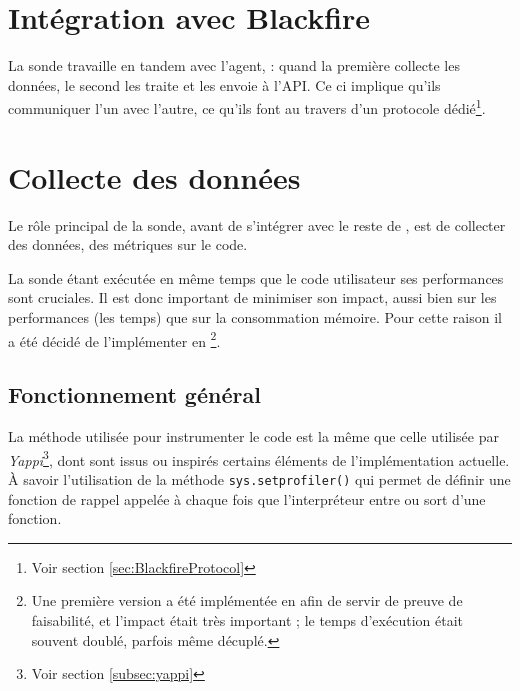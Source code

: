 
  \chapter[Intégration]{Intégration avec Blackfire}
  \label{chap:integration}
La sonde travaille en tandem avec l'agent, : quand la première collecte les données, le second les traite et les envoie à l'API. Ce ci implique qu'ils communiquer l'un avec l'autre, ce qu'ils font au travers d'un protocole dédié\footnote{Voir section \vref{sec:BlackfireProtocol}}.


  
  \chapter[Collecte]{Collecte des données}
Le rôle principal de la sonde, avant de s'intégrer avec le reste de \Blackfire, est de collecter des données, des métriques sur le code.

La sonde étant exécutée en même temps que le code utilisateur ses performances sont cruciales. Il est donc important de minimiser son impact, aussi bien sur les performances (les temps) que sur la consommation mémoire. Pour cette raison il a été décidé de l'implémenter en \C\footnote{Une première version a été implémentée en \Python afin de servir de preuve de faisabilité, et l'impact était très important ; le temps d'exécution était souvent doublé, parfois même décuplé.}.

  \section{Fonctionnement général}
La méthode utilisée pour instrumenter le code \Python est la même que celle utilisée par \emph{Yappi}\footnote{Voir section \vref{subsec:yappi}}, dont sont issus ou inspirés certains éléments de l'implémentation actuelle. À savoir l'utilisation de la méthode \verb|sys.setprofiler()| qui permet de définir une fonction de rappel appelée à chaque fois que l'interpréteur entre ou sort d'une fonction.

